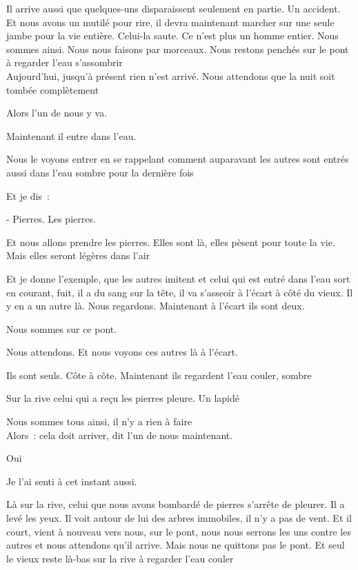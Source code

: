 Il arrive aussi que quelques-uns disparaissent seulement en partie. Un
accident. Et nous avons un mutilé pour rire, il devra maintenant marcher
sur une seule jambe pour la vie entière. Celui-la saute. Ce n'est plus
un homme entier. Nous sommes ainsi. Nous nous faisons par morceaux. Nous
restons penchés sur le pont à regarder l'eau s'assombrir\\

Aujourd'hui, jusqu'à présent rien n'est arrivé. Nous attendons que la
nuit soit tombée complètement

Alors l'un de nous y va.

Maintenant il entre dans l'eau.

Nous le voyons entrer en se rappelant comment auparavant les autres sont
entrés aussi dans l'eau sombre pour la dernière fois

Et je dis~:

- Pierres. Les pierres.

Et nous allons prendre les pierres. Elles sont là, elles pèsent pour
toute la vie. Mais elles seront légères dans l'air

Et je donne l'exemple, que les autres imitent et celui qui est entré
dans l'eau sort en courant, fuit, il a du sang sur la tête, il va
s'asseoir à l'écart à côté du vieux. Il y en a un autre là. Nous
regardons. Maintenant à l'écart ils sont deux.

Nous sommes sur ce pont.

Nous attendons. Et nous voyons ces autres là à l'écart.

Ils sont seuls. Côte à côte. Maintenant ils regardent l'eau couler,
sombre

Sur la rive celui qui a reçu les pierres pleure. Un lapidé

Nous sommes tous ainsi, il n'y a rien à faire\\

Alors~: cela doit arriver, dit l'un de nous maintenant.

Oui

Je l'ai senti à cet instant aussi.

Là sur la rive, celui que nous avons bombardé de pierres s'arrête de
pleurer. Il a levé les yeux. Il voit autour de lui des arbres immobiles,
il n'y a pas de vent. Et il court, vient à nouveau vers nous, sur le
pont, nous nous serrons les uns contre les autres et nous attendons
qu'il arrive. Mais nous ne quittons pas le pont. Et seul le vieux reste
là-bas sur la rive à regarder l'eau couler

